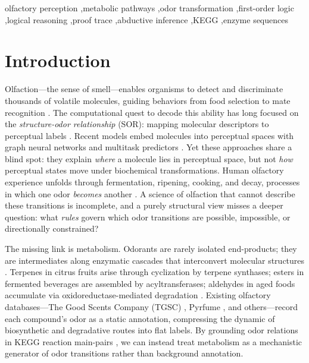 \documentclass[a4paper,fleqn]{cas-sc}
\begin{document}
\begin{keywords}
olfactory perception \sep metabolic pathways \sep odor transformation \sep first-order logic \sep logical reasoning \sep proof trace \sep abductive inference \sep KEGG \sep enzyme sequences
\end{keywords}

\maketitle

\section{Introduction}\label{sec:intro}

Olfaction---the sense of smell---enables organisms to detect and discriminate thousands of volatile molecules, guiding behaviors from food selection to mate recognition \citep{Buck1991,Leffingwell2002}. The computational quest to decode this ability has long focused on the \emph{structure-odor relationship} (SOR): mapping molecular descriptors to perceptual labels \citep{Rossiter2012,Keller2017,Chacko2019}. Recent models embed molecules into perceptual spaces with graph neural networks and multitask predictors \citep{Lee2023,Song2025}. Yet these approaches share a blind spot: they explain \emph{where} a molecule lies in perceptual space, but not \emph{how} perceptual states move under biochemical transformations. Human olfactory experience unfolds through fermentation, ripening, cooking, and decay, processes in which one odor \emph{becomes} another \citep{Schwab2008,Dunkel2014}. A science of olfaction that cannot describe these transitions is incomplete, and a purely structural view misses a deeper question: what \emph{rules} govern which odor transitions are possible, impossible, or directionally constrained?

The missing link is metabolism. Odorants are rarely isolated end-products; they are intermediates along enzymatic cascades that interconvert molecular structures \citep{Schwab2008}. Terpenes in citrus fruits arise through cyclization by terpene synthases; esters in fermented beverages are assembled by acyltransferases; aldehydes in aged foods accumulate via oxidoreductase-mediated degradation \citep{Tholl2015,Hazelwood2008,Dunkel2014}. Existing olfactory databases---The Good Scents Company (TGSC) \citep{TGSC2024}, Pyrfume \citep{Sharma2024}, and others---record each compound's odor as a static annotation, compressing the dynamic of biosynthetic and degradative routes into flat labels. By grounding odor relations in KEGG reaction main-pairs \citep{Kanehisa2021}, we can instead treat metabolism as a mechanistic generator of odor transitions rather than background annotation.
\end{document}
